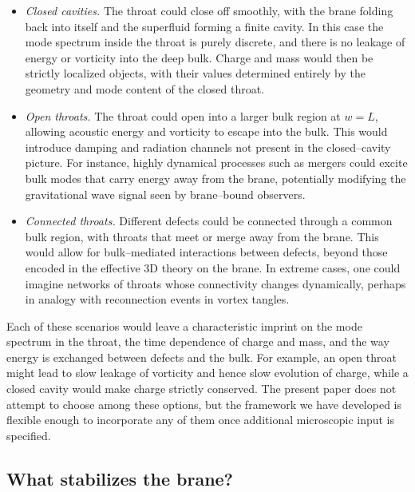 \documentclass[12pt]{article}
\begin{document}
\begin{itemize}
  \item \emph{Closed cavities.}  The throat could close off smoothly, with
        the brane folding back into itself and the superfluid forming a
        finite cavity.  In this case the mode spectrum inside the throat is
        purely discrete, and there is no leakage of energy or vorticity into
        the deep bulk.  Charge and mass would then be strictly localized
        objects, with their values determined entirely by the geometry and
        mode content of the closed throat.

  \item \emph{Open throats.}  The throat could open into a larger bulk
        region at $w=L$, allowing acoustic energy and vorticity to escape
        into the bulk.  This would introduce damping and radiation channels
        not present in the closed--cavity picture.  For instance, highly
        dynamical processes such as mergers could excite bulk modes that
        carry energy away from the brane, potentially modifying the
        gravitational wave signal seen by brane--bound observers.

  \item \emph{Connected throats.}  Different defects could be connected
        through a common bulk region, with throats that meet or merge away
        from the brane.  This would allow for bulk--mediated interactions
        between defects, beyond those encoded in the effective 3D theory on
        the brane.  In extreme cases, one could imagine networks of throats
        whose connectivity changes dynamically, perhaps in analogy with
        reconnection events in vortex tangles.
\end{itemize}

Each of these scenarios would leave a characteristic imprint on the mode
spectrum in the throat, the time dependence of charge and mass, and the way
energy is exchanged between defects and the bulk.  For example, an open
throat might lead to slow leakage of vorticity and hence slow evolution of
charge, while a closed cavity would make charge strictly conserved.  The
present paper does not attempt to choose among these options, but the
framework we have developed is flexible enough to incorporate any of them
once additional microscopic input is specified.

\subsection{What stabilizes the brane?}
\label{subsec:brane_stability}
\end{document}
